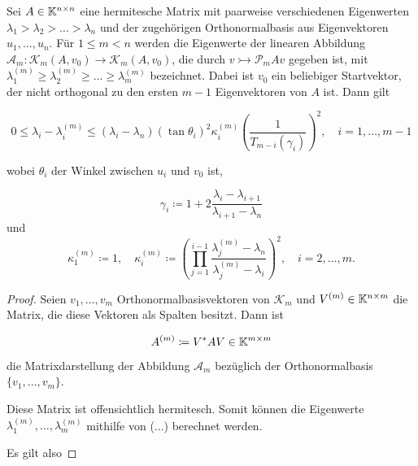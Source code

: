 \documentclass{article}
\begin{document}
\begin{theorem}
	Sei $A \in \mathbb{K}^{n \times n}$ eine hermitesche Matrix mit paarweise verschiedenen Eigenwerten $\lambda_1 > \lambda_2 > \dots > \lambda_n$ und der zugehörigen Orthonormalbasis aus Eigenvektoren $u_1,\dots,u_n$. Für $1 \le m < n$ werden die Eigenwerte der linearen Abbildung $\mathcal{A}_m: \mathcal{K}_m(A,v_0)\rightarrow \mathcal{K}_m(A,v_0)$, die durch $v \rightarrowtail \mathcal{P}_mAv$ gegeben ist,  mit $\lambda_1^{(m)} \ge \lambda_2^{(m)} \ge \dots \ge \lambda_m^{(m)}$ bezeichnet. Dabei ist $v_0$ ein beliebiger Startvektor, der nicht orthogonal zu den ersten $m-1$ Eigenvektoren von $A$ ist. Dann gilt

	\begin{equation}
		\label{konvergenz Eigenwerte}
		0 \le \lambda_i - \lambda_i^{(m)} \le (\lambda_i -\lambda_n) (\tan\theta_i)^2 \kappa_i^{(m)} \left(\frac{1}{T_{m-i}(\gamma_i)}\right)^2, \quad i=1,\dots,m-1
	\end{equation}

	wobei $\theta_i$ der Winkel zwischen $u_i$ und $v_0$ ist,

	\begin{equation*}
		\gamma_i \coloneqq 1+2 \frac{\lambda_i-\lambda_{i+1}}{\lambda_{i+1} -\lambda_n}
	\end{equation*}
und
	\begin{equation*}
		\kappa_1^{(m)} \coloneqq 1, \quad \kappa_i^{(m)} \coloneqq \left(\prod_{j=1}^{i-1} \frac{\lambda_j^{(m)} - \lambda_n}{\lambda_j^{(m)} - \lambda_i}\right)^2, \quad i = 2,\dots,m.
	\end{equation*}

	\begin{proof}

	Seien $v_1, \dots, v_m$ Orthonormalbasisvektoren von $\mathcal{K}_m$ und $V^{(m)} \in \mathbb{K}^{n\times m}$ die Matrix, die diese Vektoren als Spalten besitzt. Dann ist

	\begin{equation*}
		A^{(m)} \coloneqq V^* A V \in \mathbb{K}^{m\times m}
	\end{equation*}

	die Matrixdarstellung der Abbildung $\mathcal{A}_m$ bezüglich der Orthonormalbasis $\{v_1,\dots,v_m\}$.

	Diese Matrix ist offensichtlich hermitesch. Somit können die Eigenwerte $\lambda_1^{(m)}, \dots, \lambda_m^{(m)}$ mithilfe von (...) berechnet werden.

	Es gilt also


\end{proof}
\end{theorem}
\end{document}
